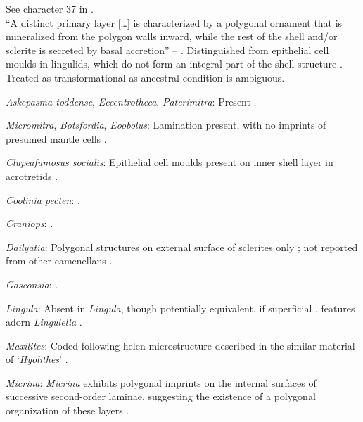 \documentclass[openany]{book}
\begin{document}
See character 37 in \citet{Williams1998Thediversity}.\\
``A distinct primary layer {[}\ldots{}{]} is characterized by a
polygonal ornament that is mineralized from the polygon walls inward,
while the rest of the shell and/or sclerite is secreted by basal
accretion'' -- \citet{Balthasar2009Homologousskeletal}. Distinguished
from epithelial cell moulds in lingulids, which do not form an integral
part of the shell structure \citep{Balthasar2009Homologousskeletal}.\\
Treated as transformational as ancestral condition is ambiguous.

\hypertarget{Askepasma_toddense-coding-135}{}
\emph{Askepasma toddense}, \emph{Eccentrotheca}, \emph{Paterimitra}:
Present \citep{Balthasar2009Homologousskeletal}.

\hypertarget{Botsfordia-coding-135}{}
\emph{Micromitra}, \emph{Botsfordia}, \emph{Eoobolus}: Lamination
present, with no imprints of presumed mantle cells
\citep[following][appendix 2]{Williams1998Thediversity}.

\hypertarget{Clupeafumosus_socialis-coding-135}{}
\emph{Clupeafumosus socialis}: Epithelial cell moulds present on inner
shell layer in acrotretids \citep{Zhang2016Epithelialcell}.

\hypertarget{Coolinia_pecten-coding-135}{}
\emph{Coolinia pecten}: \citet{Dewing2004}.

\hypertarget{Craniops-coding-135}{}
\emph{Craniops}: \citep[fig. 249.1]{Williams1997Introduction}.

\hypertarget{Dailyatia-coding-135}{}
\emph{Dailyatia}: Polygonal structures on external surface of sclerites
only \citep{Skovsted2015Theearly}; not reported from other camenellans
\citep{Balthasar2009Homologousskeletal}.

\hypertarget{Gasconsia-coding-135}{}
\emph{Gasconsia}: \citet{Hanken1985Thetaxonomy}.

\hypertarget{Lingula-coding-135}{}
\emph{Lingula}: Absent in \emph{Lingula}, though potentially equivalent,
if superficial \citep{Balthasar2009Homologousskeletal}, features adorn
\emph{Lingulella} \citep{Curry1983}.

\hypertarget{Maxilites-coding-135}{}
\emph{Maxilites}: Coded following helen microstructure described in the
similar material of `\emph{Hyolithes}' \citep{MartiMus2007}.

\hypertarget{Micrina-coding-135}{}
\emph{Micrina}: \emph{Micrina} exhibits polygonal imprints on the
internal surfaces of successive second-order laminae, suggesting the
existence of a polygonal organization of these layers
\citep{Balthasar2009Homologousskeletal}.
\end{document}
